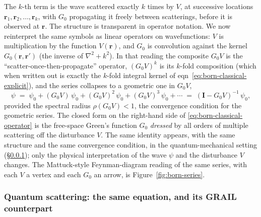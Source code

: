 \documentclass[11pt]{article}
\begin{document}
The $k$-th term is the wave scattered exactly $k$ times by $V$, at
successive locations $\mathbf{r}_1, \mathbf{r}_2, \ldots, \mathbf{r}_k$,
with $G_0$ propagating it freely between scatterings, before it is
observed at $\mathbf{r}$.  The structure is transparent in operator
notation.  We now reinterpret the same symbols as linear operators
on wavefunctions: $V$ is multiplication by the function
$V(\mathbf{r})$, and $G_0$ is convolution against the kernel
$G_0(\mathbf{r}, \mathbf{r}')$ (the inverse of $\nabla^2 + k^2$).  In
that reading the composite $G_0 V$ is the
``scatter-once-then-propagate'' operator, $(G_0 V)^k$ is its $k$-fold
composition (which when written out is exactly the $k$-fold integral
kernel of eqn~\eqref{eq:born-classical-explicit}), and the series
collapses to a geometric one in $G_0 V$,
\begin{equation}
\psi \;=\; \psi_0 + (G_0 V)\,\psi_0 + (G_0 V)^2\,\psi_0 + (G_0 V)^3\,\psi_0 + \cdots
\;=\; (\mathbf{I} - G_0 V)^{-1}\,\psi_0 ,
\label{eq:born-classical-operator}
\end{equation}
provided the spectral radius $\rho(G_0 V) < 1$, the convergence
condition for the geometric series.  The closed form on the
right-hand side of \eqref{eq:born-classical-operator} is the
free-space Green's function $G_0$ \emph{dressed} by all orders of
multiple scattering off the disturbance $V$.  The same identity
appears, with the same structure and the same convergence condition,
in the quantum-mechanical setting (\S\ref{sec:quantum-scattering});
only the physical interpretation of the wave $\psi$ and the disturbance
$V$ changes.  The Mattuck-style Feynman-diagram reading of the same
series, with each $V$ a vertex and each $G_0$ an arrow, is
Figure~\ref{fig:born-series}.

\subsubsection{Quantum scattering: the same equation, and its GRAIL counterpart}
\label{sec:quantum-scattering}
\end{document}

